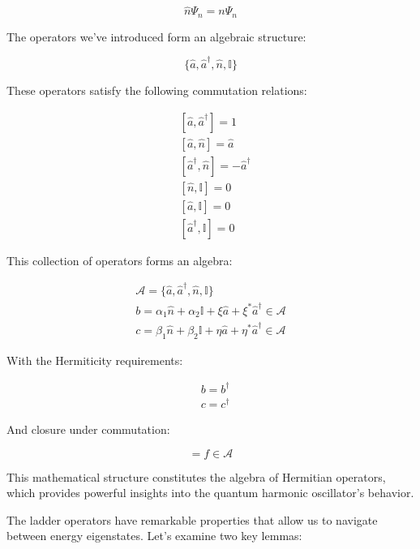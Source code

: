 \begin{equation}
\hat{n}\Psi_n = n\Psi_n
\end{equation}

The operators we've introduced form an algebraic structure:

\begin{equation}
\{\hat{a}, \hat{a}^\dagger, \hat{n}, \mathbb{I}\}
\end{equation}

These operators satisfy the following commutation relations:

\begin{align}
&[\hat{a}, \hat{a}^\dagger] = 1 \\
&[\hat{a}, \hat{n}] = \hat{a} \\
&[\hat{a}^\dagger, \hat{n}] = -\hat{a}^\dagger  \\
&[\hat{n}, \mathbb{I}] = 0 \\
&[\hat{a}, \mathbb{I}] = 0 \\
&[\hat{a}^\dagger, \mathbb{I}] = 0
\end{align}

This collection of operators forms an algebra:

\begin{gather}
\mathcal{A} = \{\hat{a}, \hat{a}^\dagger, \hat{n}, \mathbb{I}\}  \\
b = \alpha_1\hat{n} + \alpha_2\mathbb{I} + \xi\hat{a} + \xi^*\hat{a}^\dagger \in \mathcal{A} \\
c = \beta_1\hat{n} + \beta_2\mathbb{I} + \eta\hat{a} + \eta^*\hat{a}^\dagger \in \mathcal{A}
\end{gather}

With the Hermiticity requirements:

\begin{align}
&b = b^\dagger \\
&c = c^\dagger
\end{align}

And closure under commutation:

\begin{equation}
[b,c] = f \in \mathcal{A}
\end{equation}

This mathematical structure constitutes the algebra of Hermitian operators, which provides powerful insights into the quantum harmonic oscillator's behavior.

The ladder operators have remarkable properties that allow us to navigate between energy eigenstates. Let's examine two key lemmas:

